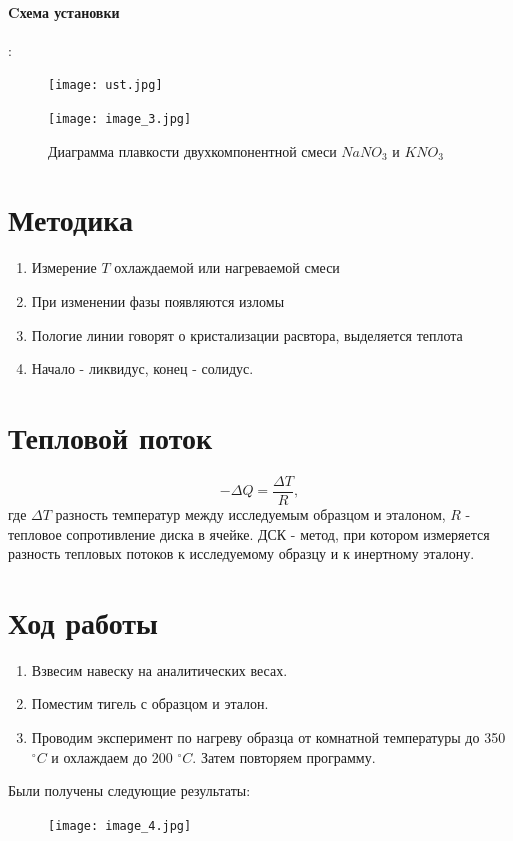 \documentclass[a4paper,12pt]{article} %
\begin{document}
\paragraph{Cхема установки}:
\begin{figure}[H]
    \centering
    \texttt{[image: ust.jpg]}
\end{figure}
\begin{figure}[H]
    \centering
    \texttt{[image: image\_3.jpg]}
    \caption{Диаграмма плавкости двухкомпонентной смеси $NaNO_3$ и $KNO_3$}
\end{figure}
\section{Методика}
\begin{enumerate}
    \item Измерение $T$ охлаждаемой или нагреваемой смеси
    \item При изменении фазы появляются изломы
    \item Пологие линии говорят о кристализации расвтора, выделяется теплота
    \item Начало - ликвидус, конец - солидус.
\end{enumerate}
\section{Тепловой поток}
\begin{equation}
    -\Delta Q = \frac{\Delta T}{R},
\end{equation}
где $\Delta T$ разность температур между исследуемым образцом и эталоном, $R$ - тепловое сопротивление диска в ячейке. 
ДСК - метод, при котором измеряется разность тепловых потоков к исследуемому образцу и к инертному эталону.

\section{Ход работы}
\begin{enumerate}
    \item Взвесим навеску на аналитических весах.
    \item Поместим тигель с образцом и эталон.
    \item Проводим эксперимент по нагреву образца от комнатной температуры до 350 $^{\circ}C$ и охлаждаем до 200 $^{\circ}C$. Затем повторяем программу. 
    \end{enumerate}
    Были получены следующие результаты:
\begin{figure}[H]
    \centering
    \texttt{[image: image\_4.jpg]}
\end{figure}
\end{document}
